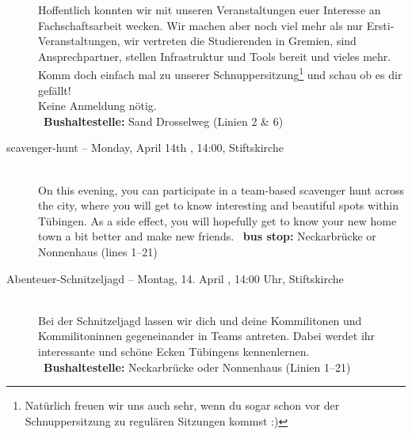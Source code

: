 \begin{description}
        Hoffentlich konnten wir mit unseren Veranstaltungen euer Interesse an Fachschaftsarbeit wecken.
        Wir machen aber noch viel mehr als nur Ersti-Veranstaltungen, wir vertreten die Studierenden in Gremien,
        sind Ansprechpartner, stellen Infrastruktur und Tools bereit und vieles mehr.
        Komm doch einfach mal zu unserer Schnuppersitzung\footnote{Natürlich freuen wir uns auch sehr, wenn du sogar schon vor der Schnuppersitzung zu regulären Sitzungen kommst :)}
        und schau ob es dir gefällt!\\
        Keine Anmeldung nötig.\\
        ~\textbf{Bushaltestelle:} Sand Drosselweg (Linien 2 \& 6)
    \fi
\fi

 \ifml
     \item[scavenger-hunt -- Monday, April 14th \YEAR, 14:00, Stiftskirche]~\\
     On this evening, you can participate in a team-based scavenger hunt across the city,
     where you will get to know interesting and beautiful spots within Tübingen.
     As a side effect, you will hopefully get to know your new home town a bit better and make new friends.
   ~\textbf{bus stop:} Neckarbrücke or Nonnenhaus (lines 1--21)
 \else
     \item[Abenteuer-Schnitzeljagd -- Montag, 14. April \YEAR, 14:00 Uhr, Stiftskirche]~\\
     Bei der Schnitzeljagd lassen wir dich und deine Kommilitonen und Kommilitoninnen gegeneinander in Teams antreten.
     Dabei werdet ihr interessante und schöne Ecken Tübingens kennenlernen.\\
   ~\textbf{Bushaltestelle:} Neckarbrücke oder Nonnenhaus (Linien 1--21)
 \fi




\end{description}

